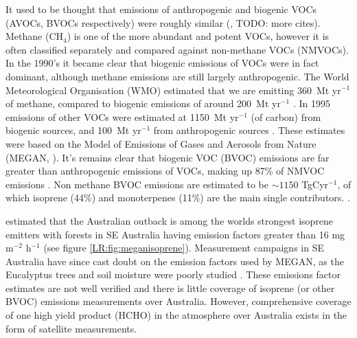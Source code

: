     It used to be thought that emissions of anthropogenic and biogenic VOCs (AVOCs, BVOCs respectively) were roughly similar (\cite{Muller1992}, TODO: more cites).
    Methane (CH$_4$) is one of the more abundant and potent VOCs, however it is often classified separately and compared against non-methane VOCs (NMVOCs).
    In the 1990's it became clear that biogenic emissions of VOCs were in fact dominant, although methane emissions are still largely anthropogenic. 
    The World Meteorological Organisation (WMO) estimated that we are emitting 360~Mt yr$^{-1}$ of methane, compared to biogenic emissions of around 200~Mt yr$^{-1}$ \citep{Atkinson2000}.
    In 1995 emissions of other VOCs were estimated at 1150~Mt yr$^{-1}$ (of carbon) from biogenic sources, and 100~Mt yr$^{-1}$ from anthropogenic sources \citep{Guenther1995, Atkinson2000}.
    These estimates were based on the Model of Emissions of Gases and Aerosols from Nature (MEGAN, \citet{Guenther1995}).
    It's remains clear that biogenic VOC (BVOC) emissions are far greater than anthropogenic emissions of VOCs, making up 87\% of NMVOC emissions \citep{Kanakidou2005, Kefauver2014}.
    Non methane BVOC emissions are estimated to be $\sim1150$ TgCyr$^{-1}$, of which isoprene (44\%) and monoterpenes (11\%) are the main single contributors. \citep{Guenther2000, Kefauver2014}. 
    
    \citet{Guenther2006} estimated that the Australian outback is among the worlds strongest isoprene emitters with forests in SE Australia having emission factors greater than 16 mg m$^{-2}$ h$^{-1}$ (see figure \ref{LR:fig:meganisoprene}).
    Measurement campaigns in SE Australia have since cast doubt on the emission factors used by MEGAN, as the Eucalyptus trees and soil moisture were poorly studied \cite{Emmerson2016}.
    These emissions factor estimates are not well verified and there is little coverage of isoprene (or other BVOC) emissions measurements over Australia.
    However, comprehensive coverage of one high yield product (HCHO) in the atmosphere over Australia exists in the form of satellite measurements.
    
